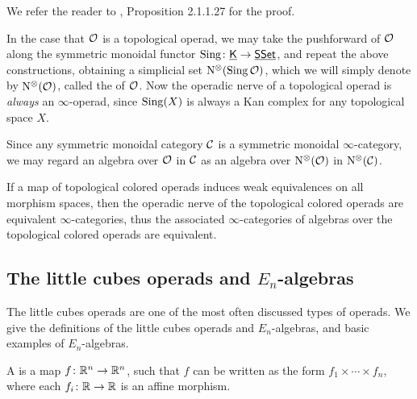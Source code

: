 \documentclass[twoside]{article}
\begin{document}
We refer the reader to \cite{Lur16}, Proposition 2.1.1.27 for the proof.

In the case that $\cal O$ is a topological operad,
we may take the pushforward of $\cal O$ along the symmetric monoidal functor 
$\operatorname{Sing}\colon\underline{\smash{\mathsf{K}}}\to\underline{\smash{\mathsf{SSet}}}$, and repeat the above constructions, obtaining
a simplicial set $\mathrm{N}^\otimes(\operatorname{Sing}\cal O)$, which we will simply denote by
$\mathrm{N}^\otimes(\cal O)$, called the  of $\cal O$.
Now the operadic nerve of a topological operad is \textit{always} 
an $\infty$-operad, since $\operatorname{Sing}(X)$ is always a Kan complex for any topological space $X$.

Since any symmetric monoidal category $\cal C$ is a symmetric monoidal 
$\infty$-category, we may regard an algebra over $\cal O$ in $\cal C$
as an algebra over $\mathrm{N}^\otimes(\cal O)$ in $\mathrm{N}^\otimes(\cal C)$.

\begin{remark}
    If a map of topological colored operads induces weak equivalences on all
    morphism spaces, then the operadic nerve of the topological colored operads
    are equivalent $\infty$-categories, thus the associated $\infty$-categories
    of algebras over the topological colored operads are equivalent.
\end{remark}

\subsection{The little cubes operads and \texorpdfstring{$E_n$}{En}-algebras}

The little cubes operads are one of the most often discussed types of operads. We
give the definitions of the little cubes operads and $E_n$-algebras,
and basic examples of $E_n$-algebras.

\begin{definition}
A  is a map $f\colon\mathbb{R}^n\to\mathbb{R}^n$, such that $f$
can be written as the form $f_1\times\cdots\times f_n$, where each $f_i\colon\mathbb{R}\to\mathbb{R}$
is an affine morphism. 
\end{definition}
\end{document}
